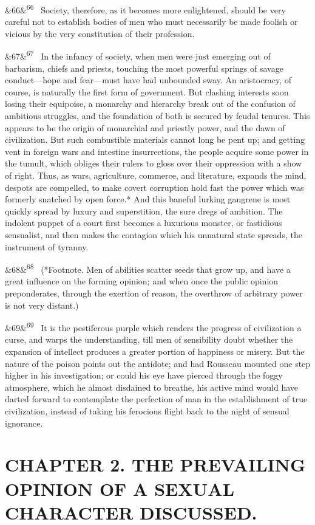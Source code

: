 \documentclass[12pt]{article}
\newcommand{\para}[1][]{\par\noindent\ifx&#1&\else\textsuperscript{\footnotesize #1}~\fi}
\begin{document}
\para[66] Society, therefore, as it becomes more enlightened, should be very careful not to establish bodies of men who must necessarily be made foolish or vicious by the very constitution of their profession.

\para[67] In the infancy of society, when men were just emerging out of barbarism, chiefs and priests, touching the most powerful springs of savage conduct---hope and fear---must have had unbounded sway. An aristocracy, of course, is naturally the first form of government. But clashing interests soon losing their equipoise, a monarchy and hierarchy break out of the confusion of ambitious struggles, and the foundation of both is secured by feudal tenures. This appears to be the origin of monarchial and priestly power, and the dawn of civilization. But such combustible materials cannot long be pent up; and getting vent in foreign wars and intestine insurrections, the people acquire some power in the tumult, which obliges their rulers to gloss over their oppression with a show of right. Thus, as wars, agriculture, commerce, and literature, expands the mind, despots are compelled, to make covert corruption hold fast the power which was formerly snatched by open force.* And this baneful lurking gangrene is most quickly spread by luxury and superstition, the sure dregs of ambition. The indolent puppet of a court first becomes a luxurious monster, or fastidious sensualist, and then makes the contagion which his unnatural state spreads, the instrument of tyranny.

\para[68] (*Footnote. Men of abilities scatter seeds that grow up, and have a great influence on the forming opinion; and when once the public opinion preponderates, through the exertion of reason, the overthrow of arbitrary power is not very distant.)

\para[69] It is the pestiferous purple which renders the progress of civilization a curse, and warps the understanding, till men of sensibility doubt whether the expansion of intellect produces a greater portion of happiness or misery. But the nature of the poison points out the antidote; and had Rousseau mounted one step higher in his investigation; or could his eye have pierced through the foggy atmosphere, which he almost disdained to breathe, his active mind would have darted forward to contemplate the perfection of man in the establishment of true civilization, instead of taking his ferocious flight back to the night of sensual ignorance.

\section*{CHAPTER 2. THE PREVAILING OPINION OF A SEXUAL CHARACTER DISCUSSED.}
\end{document}
